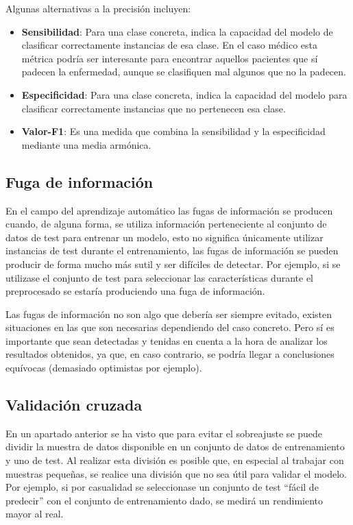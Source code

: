 Algunas alternativas a la precisión incluyen:

\begin{itemize}
    \item \textbf{Sensibilidad}: Para una clase concreta, indica la capacidad
    del modelo de clasificar correctamente instancias de esa clase. En el caso
    médico esta métrica podría ser interesante para encontrar aquellos pacientes
    que sí padecen la enfermedad, aunque se clasifiquen mal algunos que no la
    padecen.
    \item \textbf{Especificidad}: Para una clase concreta, indica la capacidad
    del modelo para clasificar correctamente instancias que no pertenecen esa
    clase.
    \item \textbf{Valor-F1}: Es una medida que combina la sensibilidad y la
    especificidad mediante una media armónica.
\end{itemize}

\subsection{Fuga de información}

En el campo del aprendizaje automático las fugas de información se producen
cuando, de alguna forma, se utiliza información perteneciente al conjunto de
datos de test para entrenar un modelo, esto no significa únicamente utilizar
instancias de test durante el entrenamiento, las fugas de información se pueden
producir de forma mucho más sutil y ser difíciles de detectar. Por ejemplo, si
se utilizase el conjunto de test para seleccionar las características durante el
preprocesado se estaría produciendo una fuga de información.

Las fugas de información no son algo que debería ser siempre evitado, existen
situaciones en las que son necesarias dependiendo del caso concreto. Pero sí es
importante que sean detectadas y tenidas en cuenta a la hora de analizar los
resultados obtenidos, ya que, en caso contrario, se podría llegar a conclusiones
equívocas (demasiado optimistas por ejemplo).

\subsection{Validación cruzada}

En un apartado anterior se ha visto que para evitar el sobreajuste se puede
dividir la muestra de datos disponible en un conjunto de datos de entrenamiento
y uno de test. Al realizar esta división es posible que, en especial al trabajar
con muestras pequeñas, se realice una división que no sea útil para validar el
modelo. Por ejemplo, si por casualidad se seleccionase un conjunto de test
``fácil de predecir'' con el conjunto de entrenamiento dado, se medirá un
rendimiento mayor al real.

